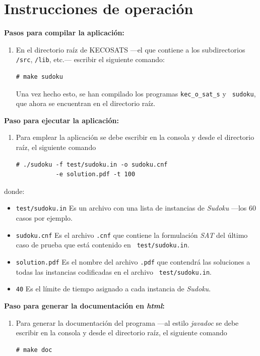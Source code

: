 \documentclass[12pt,lettersize,oneside]{article}
\begin{document}
\section{Instrucciones de operación}

\textbf{Pasos para compilar la aplicación:}
\begin{enumerate}
\item En el directorio raíz de KECOSATS ---el que contiene a los subdirectorios
  {\tt /src}, {\tt /lib}, etc.--- escribir el siguiente comando:
\begin{lstlisting}[style=consola]
# make sudoku
\end{lstlisting}

Una vez hecho esto, se han compilado los programas {\tt kec\_o\_sat\_s} y {\tt
  sudoku}, que ahora se encuentran en el directorio raíz.

\end{enumerate}

\textbf{Paso para ejecutar la aplicación:}
\begin{enumerate}
\item Para emplear la aplicación se debe escribir en la consola y desde el directorio
raíz, el siguiente comando

\begin{lstlisting}[style=consola]
# ./sudoku -f test/sudoku.in -o sudoku.cnf 
           -e solution.pdf -t 100
\end{lstlisting}
\end{enumerate}
donde:
\begin{itemize}
\item {\tt test/sudoku.in} Es un archivo con una lista de instancias de
  \emph{Sudoku} ---los 60 casos por ejemplo.
\item {\tt sudoku.cnf} Es el archivo {\tt .cnf} que contiene la formulación
  \emph{SAT} del último caso de prueba que está contenido en {\tt
    test/sudoku.in}.
\item {\tt solution.pdf} Es el nombre del archivo {\tt .pdf} que contendrá las
  soluciones a todas las instancias codificadas en el archivo {\tt
    test/sudoku.in}.
\item{\tt 40} Es el límite de tiempo asignado a cada instancia de \emph{Sudoku}.
\end{itemize}


\textbf{Paso para generar la documentación en \emph{html}:}
\begin{enumerate}
\item Para generar la documentación del programa ---al estilo \emph{javadoc} se
  debe escribir en la consola y desde el directorio raíz, el siguiente comando
\begin{lstlisting}[style=consola]
# make doc
\end{lstlisting}
\end{enumerate}\vspace{-2.5mm}
\end{document}
